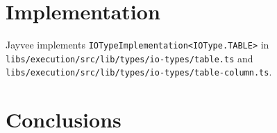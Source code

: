 



\chapter{Implementation}
\label{chapter:Implementation}

Jayvee implements \texttt{IOTypeImplementation<IOType.TABLE>} in \texttt{libs/execution/src/lib/types/io-types/table.ts} and \texttt{libs/execution/src/lib/types/io-types/table-column.ts}.



\chapter{Conclusions}
\label{chapter:Conclusions}

